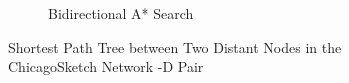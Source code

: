 \begin{figure}
\begin{subfigure}{.5\textwidth}
        \caption{Bidirectional A* Search}
        \label{fig:chicago_astar_bidirect}
    \end{subfigure}
    \vspace{1em}
    \caption{Shortest Path Tree between Two Distant Nodes in the ChicagoSketch Network -D Pair}
    \label{fig:long_sptree}
\end{figure}

